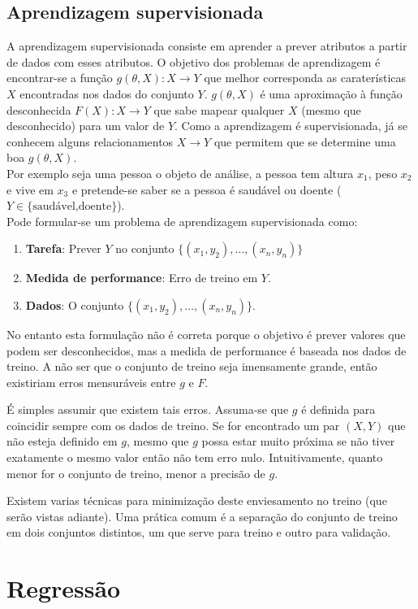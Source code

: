 \documentclass[]{report}
\begin{document}
\section{Aprendizagem supervisionada}
A aprendizagem supervisionada consiste em aprender a prever atributos a partir de dados com esses atributos.
O objetivo dos problemas de aprendizagem é encontrar-se a função $g(\theta,X):X\rightarrow Y$
que melhor corresponda as caraterísticas $X$ encontradas nos dados do conjunto $Y$.
$g(\theta,X)$ é uma aproximação à função desconhecida $F(X):X\rightarrow Y$ que sabe mapear qualquer $X$ (mesmo que desconhecido) para um valor de $Y$.
Como a aprendizagem é supervisionada, já se conhecem alguns relacionamentos $X\rightarrow Y$ que permitem que se determine uma boa $g(\theta,X)$.\\[0.2cm]
Por exemplo seja uma pessoa o objeto de análise, a pessoa tem altura $x_1$, peso $x_2$ e vive em $x_3$ e pretende-se saber se a pessoa é saudável ou doente ($Y \in \{\text{saudável,doente}\}$).\\[0.2cm]
Pode formular-se um problema de aprendizagem supervisionada como:
\begin{enumerate}
\item \textbf{Tarefa}: Prever $Y$ no conjunto $\{(x_1,y_2),\dots,(x_n,y_n)\}$
\item \textbf{Medida de performance}: Erro de treino em $Y$.
\item \textbf{Dados}: O conjunto $\{(x_1,y_2),\dots,(x_n,y_n)\}$.
\end{enumerate}
No entanto esta formulação não é correta porque o objetivo é prever valores que podem ser desconhecidos, mas a medida de performance é baseada nos dados de treino.
A não ser que o conjunto de treino seja imensamente grande, então existiriam erros mensuráveis entre $g$ e $F$.\par
É simples assumir que existem tais erros.
Assuma-se que $g$ é definida para coincidir sempre com os dados de treino.
Se for encontrado um par $(X,Y)$ que não esteja definido em $g$, mesmo que $g$ possa estar muito próxima se não tiver exatamente o mesmo valor então não tem erro nulo.
Intuitivamente, quanto menor for o conjunto de treino, menor a precisão de $g$.

Existem varias técnicas para minimização deste enviesamento no treino (que serão vistas adiante).
Uma prática comum é a separação do conjunto de treino em dois conjuntos distintos, um que serve para treino e outro para validação.
\chapter{Regressão}
\end{document}
